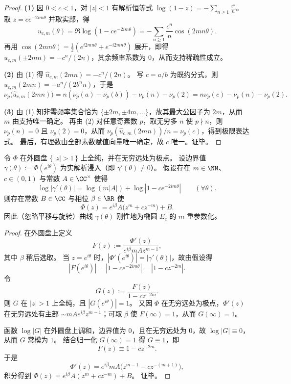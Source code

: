 \begin{proof}
\textbf{(1)} 因 \(0<c<1\)，对 \(|z|<1\) 有解析恒等式
\(
\log(1-z)=-\sum_{n\ge 1}\frac{z^n}{n}
\)。
取 \(z=c e^{-2im\theta}\) 并取实部，得
\[
u_{c,m}(\theta)=\Re\log(1-ce^{-2im\theta})
=-\sum_{n\ge 1}\frac{c^n}{n}\cos(2mn\theta).
\]
再用
\(
\cos(2mn\theta)=\tfrac12(e^{i2mn\theta}+e^{-i2mn\theta})
\)
展开，即得 \(\widehat u_{c,m}(\pm 2mn)=-c^n/(2n)\)，其余频率系数为 \(0\)，从而支持稀疏性成立。
\par
\textbf{(2)} 由 (1) 得 \(\widehat u_{c,m}(2mn)=-c^n/(2n)\)。
写 \(c=a/b\) 为既约分式，则
\(
\widehat u_{c,m}(2mn)=-a^n/(2b^n n)
\)，于是
\[
\nu_p\!\bigl(\widehat u_{c,m}(2mn)\bigr)
=n(\nu_p(a)-\nu_p(b))-\nu_p(n)-\nu_p(2)
=n\nu_p(c)-\nu_p(n)-\nu_p(2).
\]
\par
\textbf{(3)} 由 (1) 知非零频率集合恰为 \(\{\pm 2m,\pm 4m,\dots\}\)，故其最大公因子为 \(2m\)，从而 \(m\) 由支持唯一确定。
再由 (2) 对任意奇素数 \(p\)，取无穷多 \(n\) 使 \(p\nmid n\)，则 \(\nu_p(n)=0\) 且 \(\nu_p(2)=0\)，从而
\(
\nu_p(\widehat u_{c,m}(2mn))/n=\nu_p(c)
\)，得到极限表达式。
最后，有理数由全部素数赋值向量唯一确定，故 \(c\) 唯一。证毕。
\end{proof}

\begin{theorem}\label{thm:group-jg-outer-function-rigidity-joukowsky-ellipse}
令 \(\Phi\) 在外圆盘 \(\{\,|z|>1\,\}\) 上全纯，并在无穷远处为极点。
设边界值 \(\gamma(\theta):=\Phi(e^{i\theta})\) 为实解析浸入（即 \(\gamma'(\theta)\neq 0\)）。
假设存在 \(m\in\NN\)、\(c\in(0,1)\) 与常数 \(A\in\CC^\times\) 使得
\[
\log|\gamma'(\theta)|
=\log(m|A|)+\log|1-ce^{-2im\theta}|
\qquad(\forall\theta).
\]
则存在常数 \(B\in\CC\) 与相位 \(\beta\in\RR\) 使
\[
\Phi(z)=e^{i\beta}A\bigl(z^m+c z^{-m}\bigr)+B.
\]
因此（忽略平移与旋转）曲线 \(\gamma(\theta)\) 刚性地为椭圆 \(E_c\) 的 \(m\)-重参数化。
\end{theorem}

\begin{proof}
在外圆盘上定义
\[
F(z):=\frac{\Phi'(z)}{e^{i\beta}mA z^{m-1}},
\]
其中 \(\beta\) 稍后选取。
当 \(z=e^{i\theta}\) 时，\(|\Phi'(e^{i\theta})|=|\gamma'(\theta)|\)，故由假设得
\[
|F(e^{i\theta})|=|1-ce^{-2im\theta}|=|1-c z^{-2m}|.
\]
令
\[
G(z):=\frac{F(z)}{1-c z^{-2m}}.
\]
则 \(G\) 在 \(|z|>1\) 上全纯，且 \(|G(e^{i\theta})|=1\)。
又因 \(\Phi\) 在无穷远处为极点，\(\Phi'(z)\) 在无穷远处有主部 \(\sim mA e^{i\beta} z^{m-1}\)；可取 \(\beta\) 使 \(F(\infty)=1\)，从而 \(G(\infty)=1\)。
\par
函数 \(\log|G|\) 在外圆盘上调和，边界值为 \(0\)，且在无穷远处为 \(0\)，故 \(\log|G|\equiv 0\)，从而 \(G\) 常模为 \(1\)。
结合归一化 \(G(\infty)=1\) 得 \(G\equiv 1\)，即
\[
F(z)\equiv 1-c z^{-2m}.
\]
于是
\[
\Phi'(z)=e^{i\beta}mA\bigl(z^{m-1}-c z^{-(m+1)}\bigr),
\]
积分得到
\(
\Phi(z)=e^{i\beta}A(z^m+c z^{-m})+B
\)。
证毕。
\end{proof}

